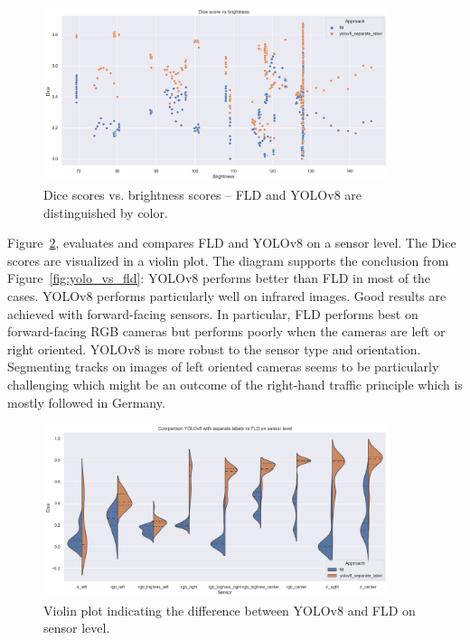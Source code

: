 \documentclass[Master,MDS,english]{BASE/twbook} %
\begin{document}
\begin{figure}[h]
\centering
\includegraphics[width=0.9\textwidth]{images/results/dice_vs_brightness_nl}
\caption{Dice scores vs. brightness scores -- FLD and YOLOv8 are distinguished by color.  }
\label{fig:dice_vs_brightness}
\end{figure}



Figure~\ref{fig:yolo_models2}, evaluates and compares FLD and YOLOv8 on a sensor level. 
The Dice scores are visualized in a violin plot.
The diagram supports the conclusion from Figure~\ref{fig:yolo_vs_fld}: YOLOv8 performs better than FLD in most of the cases. YOLOv8 performs particularly well on infrared images. Good results are achieved with forward-facing sensors. In particular, FLD performs best on forward-facing RGB cameras but performs poorly when the cameras are left or right oriented. YOLOv8 is more robust to the sensor type and orientation. Segmenting tracks on images of left oriented cameras seems to be particularly challenging which might be an outcome of the right-hand traffic principle which is mostly followed in Germany.


\begin{figure}[h]
\centering
\includegraphics[width=0.9\textwidth]{images/results/violin_plot_nl}
\caption{Violin plot indicating the difference between YOLOv8 and FLD on sensor level.  }
\label{fig:yolo_models2}
\end{figure}
\end{document}
